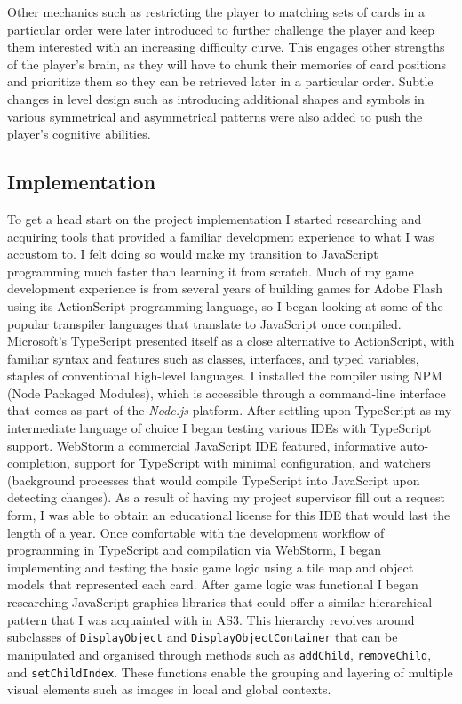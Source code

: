 \documentclass[final]{cmpreport}
\begin{document}
Other mechanics such as restricting the player to matching sets of cards in a particular order were later introduced to further challenge the player and keep them interested with an increasing difficulty curve. This engages other strengths of the player's brain, as they will have to chunk their memories of card positions and prioritize them so they can be retrieved later in a particular order. Subtle changes in level design such as introducing additional shapes and symbols in various symmetrical and asymmetrical patterns were also added to push the player's cognitive abilities.

\subsection{Implementation}

To get a head start on the project implementation I started researching and acquiring tools that provided a familiar development experience to what I was accustom to. I felt doing so would make my transition to JavaScript programming much faster than learning it from scratch. Much of my game development experience is from several years of building games for Adobe Flash using its ActionScript programming language, so I began looking at some of the popular transpiler languages that translate to JavaScript once compiled. Microsoft's TypeScript presented itself as a close alternative to ActionScript, with familiar syntax and features such as classes, interfaces, and typed variables, staples of conventional high-level languages. I installed the compiler using NPM (Node Packaged Modules), which is accessible through a command-line interface that comes as part of the \textit{Node.js} platform. After settling upon TypeScript as my intermediate language of choice I began testing various IDEs with TypeScript support. WebStorm a commercial JavaScript IDE featured, informative auto-completion, support for TypeScript with minimal configuration, and watchers (background processes that would compile TypeScript into JavaScript upon detecting changes). As a result of having my project supervisor fill out a request form, I was able to obtain an educational license for this IDE that would last the length of a year. Once comfortable with the development workflow of programming in TypeScript and compilation via WebStorm, I began implementing and testing the basic game logic using a tile map and object models that represented each card. After game logic was functional I began researching JavaScript graphics libraries that could offer a similar hierarchical pattern that I was acquainted with in AS3. This hierarchy revolves around subclasses of \texttt{DisplayObject} and \texttt{DisplayObjectContainer} that can be manipulated and organised through methods such as \texttt{addChild}, \texttt{removeChild}, and \texttt{setChildIndex}. These functions enable the grouping and layering of multiple visual elements such as images in local and global contexts.
\end{document}
